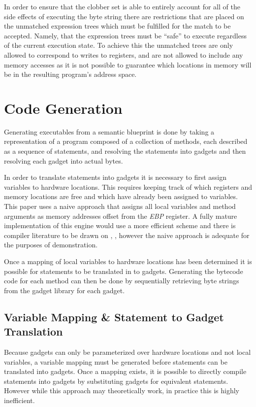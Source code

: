     In order to ensure that the clobber set is able to entirely account for all
    of the side effects of executing the byte string there are restrictions that
    are placed on the unmatched expression trees which must be fulfilled for the
    match to be accepted. Namely, that the expression trees must be ``safe'' to
    execute regardless of the current execution state. To achieve this the
    unmatched trees are only allowed to correspond to writes to registers, and
    are not allowed to include any memory accesses as it is not possible to
    guarantee which locations in memory will be in the resulting program's
    address space.

    \section{Code Generation}

    Generating executables from a semantic blueprint is done by taking a
    representation of a program composed of a collection of methods, each
    described as a sequence of statements, and resolving the statements into
    gadgets and then resolving each gadget into actual bytes.

    In order to translate statements into gadgets it is necessary to first
    assign variables to hardware locations. This requires keeping track of which
    registers and memory locations are free and which have already been assigned
    to variables. This paper uses a naive approach that assigns all local
    variables and method arguments as memory addresses offset from the
    \emph{EBP} register. A fully mature implementation of this engine would use
    a more efficient scheme and there is compiler literature to be drawn on
    \cite{register-coloring}, \cite{register-iterate}, however the naive
    approach is adequate for the purposes of demonstration.

    Once a mapping of local variables to hardware locations has been determined
    it is possible for statements to be translated in to gadgets. Generating the
    bytecode code for each method can then be done by sequentially retrieving
    byte strings from the gadget library for each gadget. 

    \subsection{Variable Mapping \& Statement to Gadget Translation}

    Because gadgets can only be parameterized over hardware locations and not
    local variables, a variable mapping must be generated before statements can
    be translated into gadgets. Once a mapping exists, it is possible to
    directly compile statements into gadgets by substituting gadgets for
    equivalent statements. However while this approach may theoretically work,
    in practice this is highly inefficient.
    
